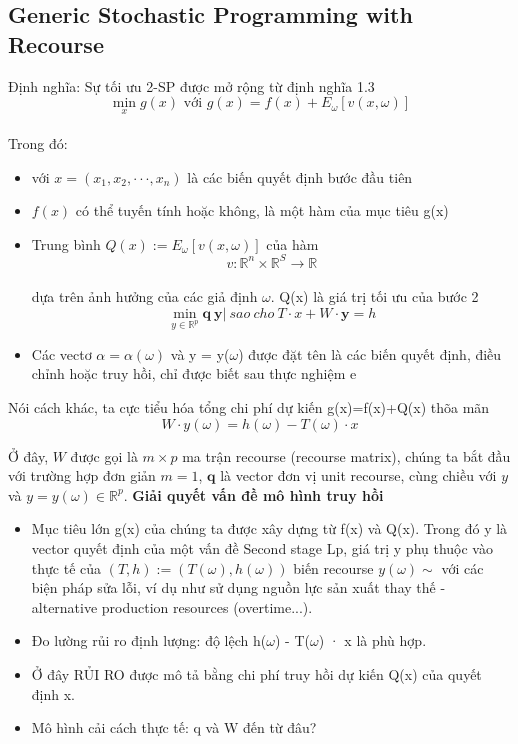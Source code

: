 \documentclass[a4paper]{article}
\begin{document}
\subsection{Generic Stochastic Programming with Recourse}
{ Định nghĩa: Sự tối ưu 2-SP được mở rộng từ định nghĩa 1.3 }
\[ \min\limits_{x}{g(x)} \text{ với } g(x) = f(x) + E_\omega[v(x,\omega)]\]\\
{Trong đó:}
\begin{itemize}
    \item với $x = (x_1,x_2,\cdot\cdot\cdot,x_n)$ là các biến quyết định bước đầu tiên
    \item $f(x)$ có thể tuyến tính hoặc không, là một hàm của mục tiêu  g(x)
    \item Trung bình  $Q(x) := E_\omega[v(x, \omega)]$ của hàm
    \[v: \mathbb{R}^n \times \mathbb{R}^S \longrightarrow \mathbb{R}\]\\
    {dựa trên ảnh hưởng của các giả định $\omega$. Q(x) là giá trị tối ưu của bước 2}
    \[\min\limits_{y\in \mathbb{R}^p}{\mathbf{q \ y} | \ sao \ cho \ T \cdot x + W \cdot \mathbf{y} = h}\]
    \item Các vectơ $\alpha = \alpha(\omega)$ và y = y($\omega$) được đặt tên là các biến quyết định, điều chỉnh hoặc truy hồi, chỉ được biết sau thực nghiệm e
\end{itemize}

{Nói cách khác, ta cực tiểu hóa tổng chi phí dự kiến g(x)=f(x)+Q(x) thõa mãn}
\[W\cdot y(\omega) = h(\omega) - T(\omega) \cdot x\]

{Ở đây, $W$ được gọi là $m \times p$ ma trận recourse (recourse matrix), chúng ta bắt đầu với trường hợp đơn giản $m = 1$, $\mathbf{q}$ là vector đơn vị unit recourse, cùng chiều với $y$ và $y = y(\omega) \in \mathbb{R}^p.$}
\newpage
\textbf{Giải quyết vấn đề mô hình truy hồi}
\begin{itemize}
    \item Mục tiêu lớn g(x) của chúng ta được xây dựng từ f(x) và Q(x). Trong đó y là vector quyết định của một vấn đề Second stage Lp, giá trị y phụ thuộc vào thực tế của $(T,h) := (T(\omega),h(\omega))$ biến recourse $y(\omega) \sim$ với các biện pháp sửa lỗi, ví dụ như sử dụng nguồn lực sản xuất thay thế - alternative production resources (overtime...).
    \item Đo lường rủi ro định lượng: độ lệch h($\omega$) - T($\omega$) · x là phù hợp.
    \item Ở đây RỦI RO được mô tả bằng chi phí truy hồi dự kiến Q(x) của quyết định x.
    \item Mô hình cải cách thực tế: q và W đến từ đâu?
\end{itemize}
\end{document}
